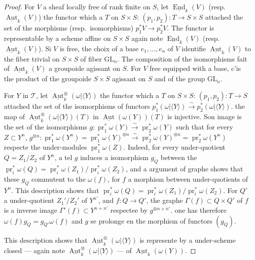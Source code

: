 \documentclass[12pt,a4paper]{article}
\theoremstyle{plain}
\theoremstyle{definition}
\theoremstyle{remark}
\DeclareMathOperator{\End}{End}
\DeclareMathOperator{\Aut}{Aut}
\DeclareMathOperator{\pr}{pr}
\begin{document}
\begin{proof}
For $V$ a sheaf locally free of rank finite on $S$, let $\underline{\End}_k(V)$ (resp.~$\underline{\Aut}_k(V)$) the functor which a $T$ on $S \times S$: $(p_1,p_2) : T \to S \times S$ attached the set of the morphisms (resp.~isomorphisms) $p_1^* V \to p_2^* V$. The functor is representable by a scheme affine on $S \times S$ again note $\underline{\End}_k(V)$ (resp.~$\underline{\Aut}_k(V)$). Si $V$ is free, the choix of a base $e_1, \ldots, e_n$ of $V$ identifie $\underline{\Aut}_k(V)$ to the fiber trivial on $S \times S$ of fiber $\mathrm{GL}_n$. The composition of the isomorphisms fait of $\underline{\Aut}_k(V)$ a groupoide agissant on $S$. For $V$ free equipped with a base, c'is the product of the groupoide $S \times S$ agissant on $S$ and of the group $\mathrm{GL}_n$.

For $Y$ in $\mathcal{T}$, let $\underline{\Aut}^\otimes_k(\omega|\langle Y \rangle)$ the functor which a $T$ on $S \times S$: $(p_1,p_2) : T \to S$ attached the set of the isomorphisms of functors $p_1^*(\omega|\langle Y \rangle) \xrightarrow{\sim} p_2^*(\omega|\langle Y \rangle)$. the map of $\underline{\Aut}^\otimes_k(\omega|\langle Y \rangle)(T)$ in $\underline{\Aut}(\omega(Y))(T)$ is injective. Son image is the set of the isomorphisms $g : \pr_1^* \omega(Y) \xrightarrow{\sim} \pr_2^* \omega(Y)$ such that for every $Z \subset Y^n$, $g^{\otimes n} : \pr_1^* \omega(Y^n) = \pr_1^* \omega(Y)^{\otimes n} \xrightarrow{\sim} \pr_2^* \omega(Y)^{\otimes n} = \pr_2^* \omega(Y^n)$ respecte the under-modules $\pr_1^* \omega(Z)$. Indeed, for every under-quotient $Q = Z_1/Z_2$ of $Y^n$, a tel $g$ induces a isomorphism $g_Q$ between the $\pr_i^* \omega(Q) = \pr_i^* \omega(Z_1)/\pr_i^* \omega(Z_2)$, and a argument of graphe shows that these $g_Q$ commutent to the $\omega(f)$, for $f$ a morphism between under-quotients of $Y^n$. This description shows that $\pr_i^* \omega(Q) = \pr_i^* \omega(Z_1)/\pr_i^* \omega(Z_2)$. For $Q'$ a under-quotient $Z_1'/Z_2'$ of $Y^{n'}$, and $f : Q \to Q'$, the graphe $\Gamma(f) \subset Q \times Q'$ of $f$ is a inverse image $\Gamma'(f) \subset Y^{n+n'}$ respectee by $g^{\otimes n+n'}$. one has therefore $\omega(f) g_Q = g_{Q'} \omega(f)$ and $g$ se prolonge en the morphism of functors $(g_Q)$.

This description shows that $\underline{\Aut}^\otimes_k(\omega|\langle Y \rangle)$ is represente by a under-scheme closed --- again note $\underline{\Aut}^\otimes_k(\omega|\langle Y \rangle)$ --- of $\underline{\Aut}_k(\omega(Y))$.


\end{proof}
\end{document}
